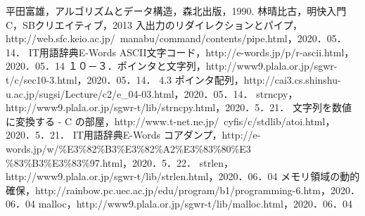 \begin{thebibliography}{99}
   平田富雄，アルゴリズムとデータ構造，森北出版，1990.
   林晴比古，明快入門C，SBクリエイティブ，2013
   入出力のリダイレクションとパイプ，http://web.sfc.keio.ac.jp/~manabu/command/contents/pipe.html，2020．05．14．
   IT用語辞典E-Words ASCII文字コード，http://e-words.jp/p/r-ascii.html，2020．05．14
   １０－３．ポインタと文字列，http://www9.plala.or.jp/sgwr-t/c/sec10-3.html，2020．05．14．
   4.3 ポインタ配列，http://cai3.cs.shinshu-u.ac.jp/sugsi/Lecture/c2/e\_04-03.html，2020．05．14．%
   strncpy，http://www9.plala.or.jp/sgwr-t/lib/strncpy.html，2020．5．21．
   文字列を数値に変換する - C の部屋，http://www.t-net.ne.jp/~cyfis/c/stdlib/atoi.html，2020．5．21．
   IT用語辞典E-Words コアダンプ，http://e-words.jp/w/\%E3\%82\%B3\%E3\%82\%A2\%E3\%83\%80\%E3
\%83\%B3\%E3\%83\%97.html，2020．5．22．%
   strlen，http://www9.plala.or.jp/sgwr-t/lib/strlen.html，2020．06．04
   メモリ領域の動的確保，http://rainbow.pc.uec.ac.jp/edu/program/b1/programming-6.htm，2020．06．04
   malloc，http://www9.plala.or.jp/sgwr-t/lib/malloc.html，2020．06．04
\end{thebibliography}


